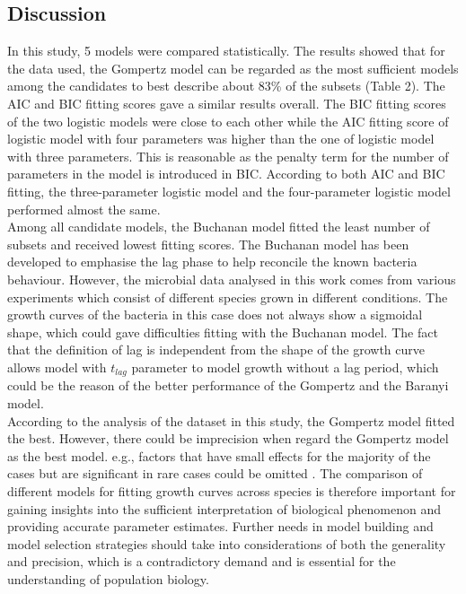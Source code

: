 \documentclass[a4paper,11pt]{article}
\theoremstyle{definition}
\begin{document}
\begin{linenumbers}
\section{Discussion}
In this study, 5 models were compared statistically. The results showed that for the data used, the Gompertz model can be regarded as the most sufficient models among the candidates to best describe about 83\% of the subsets (Table 2). The AIC and BIC fitting scores gave a similar results overall. The BIC fitting scores of the two logistic models were close to each other while the AIC fitting score of logistic model with four parameters was higher than the one of logistic model with three parameters. This is reasonable as the penalty term for the number of parameters in the model is introduced in BIC. According to both AIC and BIC fitting, the three-parameter logistic model and the four-parameter logistic model performed almost the same.\\
Among all candidate models, the Buchanan model fitted the least number of subsets and received lowest fitting scores. The Buchanan model has been developed to emphasise the lag phase to help reconcile the known bacteria behaviour. However, the microbial data analysed in this work comes from various experiments which consist of different species grown in different conditions. The growth curves of the bacteria in this case does not always show a sigmoidal shape, which could gave difficulties fitting with the Buchanan model. The fact that the definition of lag is independent from the shape of the growth curve allows model with $t_{lag}$ parameter to model growth without a lag period, which could be the reason of the better performance of the Gompertz and the Baranyi model. \\
According to the analysis of the dataset in this study, the Gompertz model fitted the best. However, there could be imprecision when regard the Gompertz model as the best model. e.g., factors that have small effects for the majority of the cases but are significant in rare cases could be omitted \citep{levins1966strategy}. The comparison of different models for fitting growth curves across species is therefore important for gaining insights into the sufficient interpretation of biological phenomenon and providing accurate parameter estimates. Further needs in model building and model selection strategies should take into considerations of both the generality and precision, which is a contradictory demand and is essential for the understanding of population biology.

\end{linenumbers}


  
\end{document}

